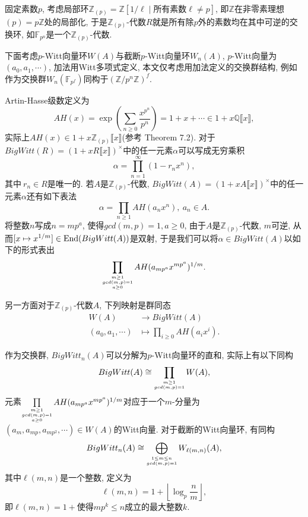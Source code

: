 固定素数$p$, 考虑局部环$\mathbb{Z}_{(p)}=\mathbb{Z}[1/\ell \mid \text{所有素数}\ell\neq p]$, 即$\mathbb{Z}$在非零素理想$(p)=p \mathbb{Z}$处的局部化, 于是$\mathbb{Z}_{(p)}$-代数$R$就是所有除$p$外的素数均在其中可逆的交换环, 如$\mathbb{F}_{p^n}$是一个$\mathbb{Z}_{(p)}$-代数. 

下面考虑$p$-Witt向量环$W(A)$与截断$p$-Witt向量环$W_n(A)$, $p$-Witt向量为$(a_0, a_1, \cdots)$, 加法用Witt多项式定义, 本文仅考虑用加法定义的交换群结构, 例如
作为交换群$W_n(\mathbb{F}_{p^f})$同构于$(\mathbb{Z}/p^n\mathbb{Z})^f$. %

Artin-Hasse级数定义为
\[AH(x)= \exp(\sum_{n\geq 0}\frac{x^{p^n}}{p^n})=1+x+\cdots \in 1+x \mathbb{Q}\llbracket x\rrbracket , \]
实际上$AH(x)\in 1+x \mathbb{Z}_{(p)}\llbracket x\rrbracket $(参考\cite{rabinoff2014theory} Theorem 7.2). 对于$BigWitt(R)=(1+xR\llbracket x\rrbracket)^{\times}$中的任一元素$\alpha$可以写成无穷乘积
\[\alpha = \prod_{n=1}^{\infty}(1-r_nx^n),  \]
其中$\ r_n\in R$是唯一的. 若$A$是$\mathbb{Z}_{(p)}$-代数, $BigWitt(A)=(1+xA\llbracket x\rrbracket)^{\times}$中的任一元素$\alpha$还有如下表法 \cite{katz2013witt}
\[\alpha = \prod_{n\geq 1}AH(a_n x^n), \ a_n\in A. \]
将整数$n$写成$n=mp^a$, 使得$gcd(m, p)=1, a\geq 0$, 由于$A$是$\mathbb{Z}_{(p)}$-代数, $m$可逆, 从而$[x\mapsto x^{1/m}]\in \mathrm{End}(BigWitt(A))$是双射, 于是我们可以将$\alpha\in BigWitt(A)$以如下的形式表出
\[\prod_{\scriptsize\substack{m\geq 1 \\ gcd(m, p)=1  \\ a\geq 0}}AH(a_{mp^a} x^{mp^a})^{1/m}. \]

另一方面对于$\mathbb{Z}_{(p)}$-代数$A$, 下列映射是群同态
\begin{align*}
W(A)&\longrightarrow BigWitt(A)\\
(a_0, a_1, \cdots) &\mapsto \prod_{i\geq 0}AH(a_i x^i). 
\end{align*}

作为交换群, $BigWitt_n(A)$可以分解为$p$-Witt向量环的直和, 实际上有以下同构\cite{Lauter1999A} %
\[
BigWitt(A) \cong \prod_{\scriptsize\substack{m\geq 1 \\ gcd(m, p)=1}} W(A), 
\]
元素$\prod\limits_{\scriptsize\substack{m\geq 1 \\ gcd(m, p)=1  \\ a\geq 0}}AH(a_{mp^a} x^{mp^a})^{1/m}$对应于一个$m$-分量为$(a_m, a_{mp}, a_{mp^2}, \cdots)\in W(A)$的Witt向量. 
对于截断的Witt向量环, 有同构\[
BigWitt_n(A) \cong \bigoplus_{\scriptsize\substack{1\leq m\leq n \\ gcd(m, p)=1}} W_{\ell(m, n)}(A), 
\]
其中$\ell(m, n)$是一个整数, 定义为
\[\ell(m, n)=1+\left \lfloor\log_p \frac{n}{m}  \right \rfloor, \]
即$\ell(m, n)=1+\text{使得$mp^k\leq n$成立的最大整数$k$}.$


